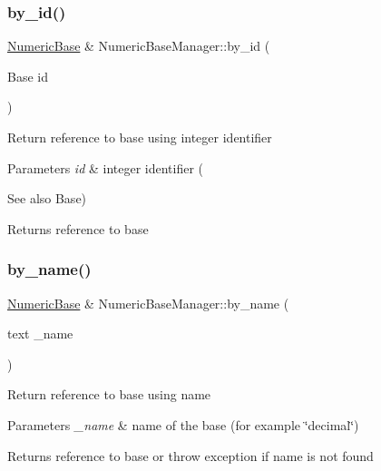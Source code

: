 \subsubsection{\texorpdfstring{by\+\_\+id()}{by\_id()}}
{\footnotesize\ttfamily \hyperlink{classez_1_1essential_1_1NumericBase}{Numeric\+Base} \& Numeric\+Base\+Manager\+::by\+\_\+id (\begin{DoxyParamCaption}\item[{Base}]{id }\end{DoxyParamCaption})}

Return reference to base using integer identifier 
\begin{DoxyParams}{Parameters}
{\em id} & integer identifier (\\
\hline
\end{DoxyParams}
\begin{DoxySeeAlso}{See also}
Base) 
\end{DoxySeeAlso}
\begin{DoxyReturn}{Returns}
reference to base 
\end{DoxyReturn}
\mbox{\label{classez_1_1essential_1_1NumericBaseManager_a08b4f97124709d5641d595a8863f300e}} 
\subsubsection{\texorpdfstring{by\+\_\+name()}{by\_name()}}
{\footnotesize\ttfamily \hyperlink{classez_1_1essential_1_1NumericBase}{Numeric\+Base} \& Numeric\+Base\+Manager\+::by\+\_\+name (\begin{DoxyParamCaption}\item[{text}]{\+\_\+name }\end{DoxyParamCaption})}

Return reference to base using name 
\begin{DoxyParams}{Parameters}
{\em \+\_\+name} & name of the base (for example \char`\"{}decimal\char`\"{}) \\
\hline
\end{DoxyParams}
\begin{DoxyReturn}{Returns}
reference to base or throw exception if name is not found 
\end{DoxyReturn}
\mbox{\label{classez_1_1essential_1_1NumericBaseManager_a52a521ef2f57e881184724a38ba97cc2}} 
